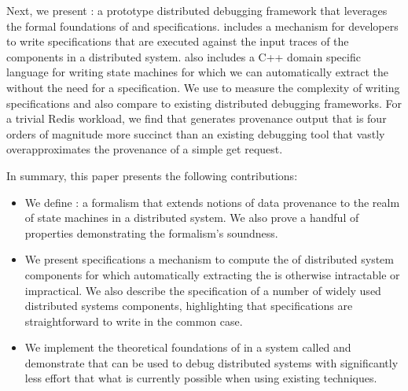 Next, we present \fluent{}: a prototype distributed debugging framework that
leverages the formal foundations of \watprovenance{} and \watprovenance{}
specifications. \fluent{} includes a mechanism for developers to write
\watprovenance{} specifications that are executed against the input traces of
the components in a distributed system. \fluent{} also includes a C++ domain
specific language for writing state machines for which we can automatically
extract the \watprovenance{} without the need for a \watprovenance{}
specification. We use \fluent{} to measure the complexity of writing
\watprovenance{} specifications and also compare \fluent{} to existing
distributed debugging frameworks. For a trivial Redis workload, we find that
\fluent{} generates provenance output that is four orders of magnitude more
succinct than an existing debugging tool that vastly overapproximates the
provenance of a simple get request.

In summary, this paper presents the following contributions:
\begin{itemize}
  \item
    We define \watprovenance{}: a formalism that extends notions of data
    provenance to the realm of state machines in a distributed system. We also
    prove a handful of properties demonstrating the formalism's soundness.
  \item
    We present \watprovenance{} specifications a mechanism to compute the
    \watprovenance{} of distributed system components for which automatically
    extracting the \watprovenance{} is otherwise intractable or impractical. We
    also describe the \watprovenance{} specification of a number of widely used
    distributed systems components, highlighting that \watprovenance{}
    specifications are straightforward to write in the common case.
  \item
    We implement the theoretical foundations of \watprovenance{} in a system
    called \fluent{} and demonstrate that \fluent{} can be used to debug
    distributed systems with significantly less effort that what is currently
    possible when using existing techniques.
\end{itemize}
